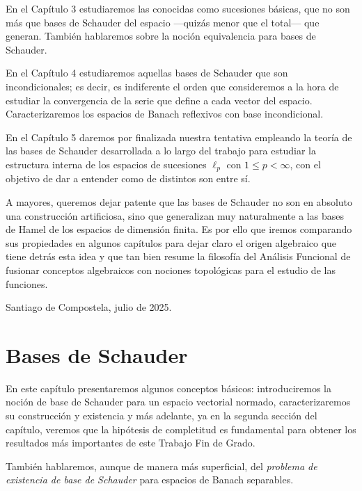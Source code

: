 \documentclass[
  spanish,
  letterpaper,
  DIV=11,
  numbers=noendperiod]{scrreprt}
\theoremstyle{definition}
\theoremstyle{remark}
\theoremstyle{definition}
\theoremstyle{exampstyle}
\theoremstyle{plain}
\theoremstyle{plain}
\theoremstyle{definition}
\theoremstyle{plain}
\theoremstyle{remark}
\begin{document}
En el Capítulo 3 estudiaremos las conocidas como sucesiones básicas, que
no son más que bases de Schauder del espacio ---quizás menor que el
total--- que generan. También hablaremos sobre la noción equivalencia
para bases de Schauder.

En el Capítulo 4 estudiaremos aquellas bases de Schauder que son
incondicionales; es decir, es indiferente el orden que consideremos a la
hora de estudiar la convergencia de la serie que define a cada vector
del espacio. Caracterizaremos los espacios de Banach reflexivos con base
incondicional.

En el Capítulo 5 daremos por finalizada nuestra tentativa empleando la
teoría de las bases de Schauder desarrollada a lo largo del trabajo para
estudiar la estructura interna de los espacios de sucesiones \(\ell_p\)
con \(1\leq p<\infty\), con el objetivo de dar a entender como de
distintos son entre sí.

A mayores, queremos dejar patente que las bases de Schauder no son en
absoluto una construcción artificiosa, sino que generalizan muy
naturalmente a las bases de Hamel de los espacios de dimensión finita.
Es por ello que iremos comparando sus propiedades en algunos capítulos
para dejar claro el origen algebraico que tiene detrás esta idea y que
tan bien resume la filosofía del Análisis Funcional de fusionar
conceptos algebraicos con nociones topológicas para el estudio de las
funciones.

\begin{flushright}
    Santiago de Compostela, julio de 2025.
\end{flushright}


\chapter{Bases de Schauder}\label{bases-de-schauder}

En este capítulo presentaremos algunos conceptos básicos: introduciremos
la noción de base de Schauder para un espacio vectorial normado,
caracterizaremos su construcción y existencia y más adelante, ya en la
segunda sección del capítulo, veremos que la hipótesis de completitud es
fundamental para obtener los resultados más importantes de este Trabajo
Fin de Grado.

También hablaremos, aunque de manera más superficial, del \emph{problema
de existencia de base de Schauder} para espacios de Banach separables.
\end{document}

